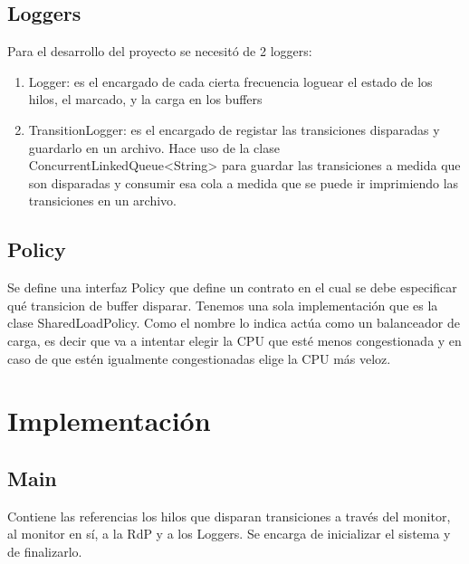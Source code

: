 \documentclass[a4paper,11pt]{article}
\begin{document}
    \subsection{Loggers}
    Para el desarrollo del proyecto se necesitó de 2 loggers:
    \begin{enumerate}
        \item Logger: es el encargado de cada cierta frecuencia loguear el estado de los hilos, el marcado, y la carga en los buffers
        \item TransitionLogger: es el encargado de registar las transiciones disparadas y guardarlo en un archivo.
        Hace uso de la clase  ConcurrentLinkedQueue<String> para guardar las transiciones a medida que son disparadas y consumir esa cola a medida que se puede ir imprimiendo las transiciones en un archivo.
    \end{enumerate}
    \subsection{Policy}
    Se define una interfaz Policy que define un contrato en el cual se debe especificar qué transicion de buffer disparar.
    Tenemos una sola implementación que es la clase SharedLoadPolicy. Como el 
    nombre lo indica actúa como un balanceador de carga, es decir que va a intentar
    elegir la CPU que esté menos congestionada y en caso de que estén igualmente congestionadas elige la CPU más
    veloz.
    
    \section{Implementación}
    \subsection{Main}
    Contiene las referencias los hilos que disparan transiciones a través del monitor,
    al monitor en sí, a la RdP y a los Loggers.
    Se encarga de inicializar el sistema y de finalizarlo.
    
\end{document}
